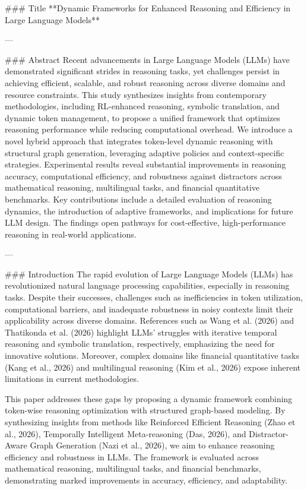 ### Title  
**Dynamic Frameworks for Enhanced Reasoning and Efficiency in Large Language Models**

---

### Abstract  
Recent advancements in Large Language Models (LLMs) have demonstrated significant strides in reasoning tasks, yet challenges persist in achieving efficient, scalable, and robust reasoning across diverse domains and resource constraints. This study synthesizes insights from contemporary methodologies, including RL-enhanced reasoning, symbolic translation, and dynamic token management, to propose a unified framework that optimizes reasoning performance while reducing computational overhead. We introduce a novel hybrid approach that integrates token-level dynamic reasoning with structural graph generation, leveraging adaptive policies and context-specific strategies. Experimental results reveal substantial improvements in reasoning accuracy, computational efficiency, and robustness against distractors across mathematical reasoning, multilingual tasks, and financial quantitative benchmarks. Key contributions include a detailed evaluation of reasoning dynamics, the introduction of adaptive frameworks, and implications for future LLM design. The findings open pathways for cost-effective, high-performance reasoning in real-world applications.

---

### Introduction  
The rapid evolution of Large Language Models (LLMs) has revolutionized natural language processing capabilities, especially in reasoning tasks. Despite their successes, challenges such as inefficiencies in token utilization, computational barriers, and inadequate robustness in noisy contexts limit their applicability across diverse domains. References such as Wang et al. (2026) and Thatikonda et al. (2026) highlight LLMs' struggles with iterative temporal reasoning and symbolic translation, respectively, emphasizing the need for innovative solutions. Moreover, complex domains like financial quantitative tasks (Kang et al., 2026) and multilingual reasoning (Kim et al., 2026) expose inherent limitations in current methodologies.  

This paper addresses these gaps by proposing a dynamic framework combining token-wise reasoning optimization with structured graph-based modeling. By synthesizing insights from methods like Reinforced Efficient Reasoning (Zhao et al., 2026), Temporally Intelligent Meta-reasoning (Das, 2026), and Distractor-Aware Graph Generation (Nazi et al., 2026), we aim to enhance reasoning efficiency and robustness in LLMs. The framework is evaluated across mathematical reasoning, multilingual tasks, and financial benchmarks, demonstrating marked improvements in accuracy, efficiency, and adaptability.

